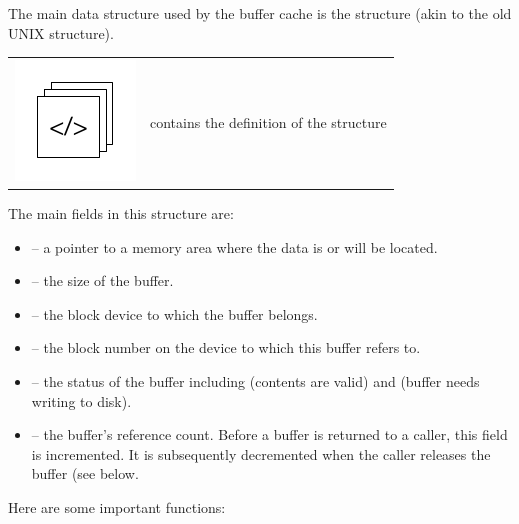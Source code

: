The main data structure used by the buffer cache is the  structure (akin to the old UNIX  structure). 

\begin{table}[h]
\begin{tabular}{ll}
\parbox[l]{0.6in}{\includegraphics[scale=0.8]{figures/src-xref.pdf}} & \parbox[l]{4in}{\small{ contains the definition of the  structure}}
\end{tabular}
\end{table}

\noindent
The main fields in this structure are:

\begin{itemize}
	\item {} -- a pointer to a memory area where the data is or will be located.
	\item {} -- the size of the buffer.
	\item {} -- the block device to which the buffer belongs.
	\item {} -- the block number on the device to which this buffer refers to.
	\item {} -- the status of the buffer including  (contents are valid) and 
		 (buffer needs writing to disk).
	\item {} -- the buffer's reference count. Before a buffer is returned to a caller, this field is incremented. 
		It is subsequently decremented when the caller releases the buffer (see  below.
\end{itemize}

\noindent
Here are some important functions:

